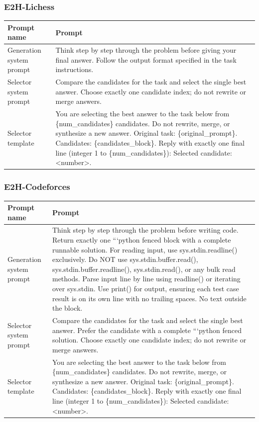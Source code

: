 \subsubsection*{E2H-Lichess}
\begin{tabular}{@{}Lp{.76\textwidth}@{}}\hline
\textbf{Prompt name} & \textbf{Prompt} \\ \hline
Generation system prompt & \tiny Think step by step through the problem before giving your final answer. Follow the output format specified in the task instructions. \\
Selector system prompt & \tiny Compare the candidates for the task and select the single best answer. Choose exactly one candidate index; do not rewrite or merge answers. \\
Selector template & \tiny You are selecting the best answer to the task below from \{num\_candidates\} candidates. Do not rewrite, merge, or synthesize a new answer. Original task: \{original\_prompt\}. Candidates: \{candidates\_block\}. Reply with exactly one final line (integer 1 to \{num\_candidates\}): Selected candidate: <number>. \\ \hline
\end{tabular}
\subsubsection*{E2H-Codeforces}
\begin{tabular}{@{}Lp{.76\textwidth}@{}}\hline
\textbf{Prompt name} & \textbf{Prompt} \\ \hline
Generation system prompt & \tiny Think step by step through the problem before writing code. Return exactly one ```python fenced block with a complete runnable solution. For reading input, use sys.stdin.readline() exclusively. Do NOT use sys.stdin.buffer.read(), sys.stdin.buffer.readline(), sys.stdin.read(), or any bulk read methods. Parse input line by line using readline() or iterating over sys.stdin. Use print() for output, ensuring each test case result is on its own line with no trailing spaces. No text outside the block. \\
Selector system prompt & \tiny Compare the candidates for the task and select the single best answer. Prefer the candidate with a complete ```python fenced solution. Choose exactly one candidate index; do not rewrite or merge answers. \\
Selector template & \tiny You are selecting the best answer to the task below from \{num\_candidates\} candidates. Do not rewrite, merge, or synthesize a new answer. Original task: \{original\_prompt\}. Candidates: \{candidates\_block\}. Reply with exactly one final line (integer 1 to \{num\_candidates\}): Selected candidate: <number>. \\ \hline
\end{tabular}

